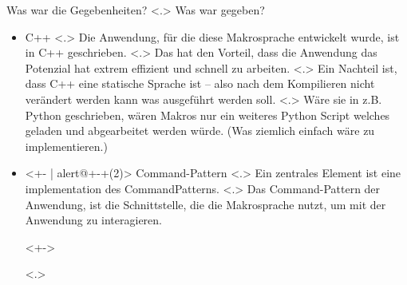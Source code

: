   \begin{frame}{Was war die Gegebenheiten?}
    \pause
        \note[item]<.>{
          Was war gegeben?
        }

    \begin{itemize}[<+- | alert@+>]
      \item
        C++
            \note[item]<.>{
              Die Anwendung, für die diese Makrosprache entwickelt wurde, ist in C++ geschrieben.
            }
            \note[item]<.>{
              Das hat den Vorteil, dass die Anwendung das Potenzial hat extrem effizient und schnell zu arbeiten.
            }
            \note[item]<.>{
              Ein Nachteil ist, dass C++ eine statische Sprache ist -- also nach dem Kompilieren nicht verändert werden kann was ausgeführt werden soll.
            }
            \note[item]<.>{
              Wäre sie in z.B. Python geschrieben, wären Makros nur ein weiteres Python Script welches geladen und abgearbeitet werden würde. (Was ziemlich einfach wäre zu implementieren.)
            }
      \item<+- | alert@+-+(2)>
        Command-Pattern%
            \note[item]<.>{
              Ein zentrales Element ist eine implementation des CommandPatterns.
            }
            \note[item]<.>{
              Das Command-Pattern der Anwendung, ist die Schnittstelle, die die Makrosprache nutzt, um mit der Anwendung zu interagieren.
            }
        \begin{uncoverenv}<+->%
          \begin{uncoverenv}<.>%
\end{uncoverenv}
\end{uncoverenv}
\end{itemize}
\end{frame}
